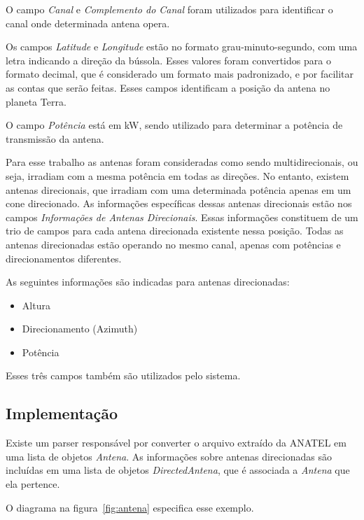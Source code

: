 O campo \textit{Canal} e \textit{Complemento do Canal} foram utilizados para identificar o canal onde determinada antena opera.

Os campos \textit{Latitude} e \textit{Longitude} estão no formato grau-minuto-segundo, com uma letra indicando a direção da bússola. Esses valores foram convertidos para o formato decimal, que é considerado um formato mais padronizado, e por facilitar as contas que serão feitas. Esses campos identificam a posição da antena no planeta Terra.

O campo \textit{Potência} está em kW, sendo utilizado para determinar a potência de transmissão da antena.

Para esse trabalho as antenas foram consideradas como sendo multidirecionais, ou seja, irradiam com a mesma potência em todas as direções. No entanto, existem antenas direcionais, que irradiam com uma determinada potência apenas em um cone direcionado. As informações específicas dessas antenas direcionais estão nos campos \textit{Informações de Antenas Direcionais}. Essas informações constituem de um trio de campos para cada antena direcionada existente nessa posição. Todas as antenas direcionadas estão operando no mesmo canal, apenas com potências e direcionamentos diferentes.

As seguintes informações são indicadas para antenas direcionadas:

\begin{itemize}
\item Altura
\item Direcionamento (Azimuth)
\item Potência
\end{itemize}

Esses três campos também são utilizados pelo sistema.


\subsection{Implementação}

Existe um parser responsável por converter o arquivo extraído da ANATEL em uma lista de objetos \textit{Antena}. As informações sobre antenas direcionadas são incluídas em uma lista de objetos  \textit{DirectedAntena}, que é associada a \textit{Antena} que ela pertence.

O diagrama na figura~\ref{fig:antena} especifica esse exemplo.

